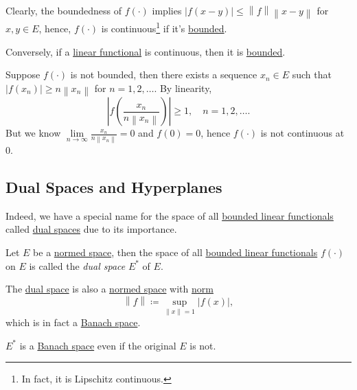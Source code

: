 Clearly, the boundedness of \(f(\cdot)\) implies \(\left\vert f(x-y) \right\vert \leq \left\lVert f\right\rVert \left\lVert x-y\right\rVert \) for \(x, y\in E\), hence, \(f(\cdot)\) is continuous\footnote{In fact, it is Lipschitz continuous.} if it's \hyperref[def:bounded-linear-functional]{bounded}.

\begin{remark}
	Conversely, if a \hyperref[def:linear-functional]{linear functional} is continuous, then it is \hyperref[def:bounded-linear-functional]{bounded}.
\end{remark}
\begin{explanation}
	Suppose \(f(\cdot)\) is not bounded, then there exists a sequence \(x_n\in E\) such that \(\left\vert f(x_n) \right\vert \geq n \left\lVert x_n\right\rVert \) for \(n = 1, 2, \dots  \). By linearity,
	\[
		\left\vert f \left( \frac{x_{n} }{n \left\lVert x_{n} \right\rVert } \right) \right\vert \geq 1, \quad n = 1, 2, \dots.
	\]
	But we know \(\lim\limits_{n \to \infty} \frac{x_{n} }{n \left\lVert x_{n} \right\rVert }=0\) and \(f(0) = 0\), hence \(f(\cdot)\) is not continuous at \(0\).
\end{explanation}

\subsection{Dual Spaces and Hyperplanes}
Indeed, we have a special name for the space of all \hyperref[def:bounded-linear-functional]{bounded linear functionals} called \hyperref[def:dual-space]{dual spaces} due to its importance.

\begin{definition}\label{def:dual-space}
	Let \(E\) be a \hyperref[def:normed-vector-space]{normed space}, then the space of all \hyperref[def:bounded-linear-functional]{bounded linear functionals} \(f(\cdot)\) on \(E\) is called the \emph{dual space} \(E^{\ast} \) of \(E\).
\end{definition}

The \hyperref[def:dual-space]{dual space} is also a \hyperref[def:normed-vector-space]{normed space} with \hyperref[def:norm]{norm}
\[
	\left\lVert f\right\rVert \coloneqq \sup _{\left\lVert x\right\rVert = 1}\left\vert f(x) \right\vert,
\]
which is in fact a \hyperref[def:Banach-space]{Banach space}.

\begin{remark}
	\(E^{\ast} \) is a \hyperref[def:Banach-space]{Banach space} even if the original \(E\) is not.
\end{remark}

